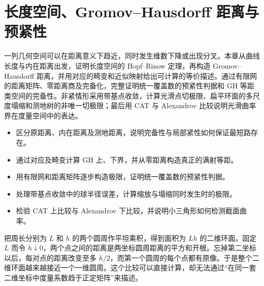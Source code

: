 
% 
% 

\chapter{长度空间、Gromov–Hausdorff 距离与预紧性}
\label{g3:ch:10}

\begin{chapterabstract}
一列几何空间可以在距离意义下趋近，同时发生维数下降或出现分叉。本章从曲线长度与内在距离出发，证明长度空间的 Hopf--Rinow 定理，再构造 Gromov--Hausdorff 距离，并用对应的畸变和近似映射给出可计算的等价描述。通过有限网的距离矩阵、零距离商及完备化，完整证明统一覆盖数的预紧性判据和 GH 等距类空间的完备性。非紧情形采用带基点收敛，计算光滑点切极限、扁平环面的多尺度塌缩和测地树的非唯一切极限；最后用 CAT 与 Alexandrov 比较说明光滑曲率界在度量空间中的表达。
\end{chapterabstract}

\begin{learninggoals}
\begin{itemize}
	\item 区分原距离、内在距离及测地距离，说明完备性与局部紧性如何保证最短路存在。
	\item 通过对应及畸变计算 GH 上、下界，并从零距离构造真正的满射等距。
	\item 用有限网和距离矩阵逐步构造极限，证明统一覆盖数的预紧性判据。
	\item 处理带基点收敛中的球半径误差，计算缩放与塌缩同时发生时的极限。
	\item 检验 CAT 上比较与 Alexandrov 下比较，并说明小三角形如何检测截面曲率。
\end{itemize}
\end{learninggoals}

把周长分别为 \(L\) 和 \(h\) 的两个圆周作平坦乘积，得到面积为 \(Lh\) 的二维环面。固定 \(L\) 而令 \(h\downarrow0\)，两个点之间的距离是两坐标圆周距离的平方和开根。忘掉第二坐标以后，每对点的距离改变至多 \(h/2\)，而第一个圆周的每个点都有原像。于是整个二维环面越来越接近一个一维圆周。这个比较可以直接计算，却无法通过“在同一套二维坐标中度量系数趋于正定矩阵”来描述。

\ProseParagraphBreak

